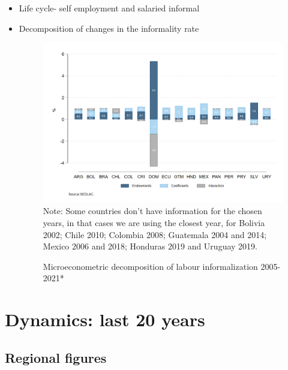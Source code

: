 \documentclass[english]{article}
\begin{document}
\begin{itemize}
\item Life cycle- self employment and salaried informal
\item Decomposition of changes in the informality rate
 \begin{figure}[!htb]
        \centering
        \caption{Microeconometric decomposition of labour informalization 2005-2021*}     
        \includegraphics[scale=.3]{latex/figures/Snapshot/Oaxaca decomposition.png}
        \label{fig:Oaxaca decomposition}
        \footnotesize{Note: Some countries don’t have information for the chosen years, in that cases we are using the closest year, for Bolivia 2002; Chile 2010; Colombia 2008; Guatemala 2004 and 2014; Mexico 2006 and 2018; Honduras 2019 and Uruguay 2019.}
        \end{figure}

\end{itemize}

     

     
     
\section{Dynamics: last 20 years}  
       

\subsection{Regional figures}
\end{document}
